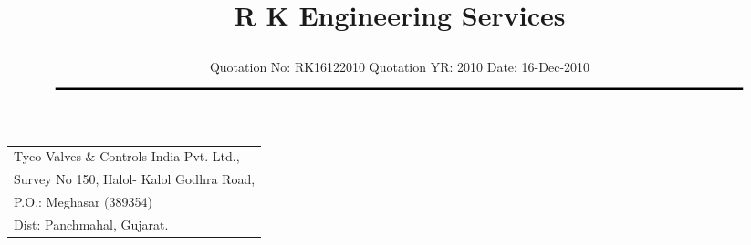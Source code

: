 \documentclass[11pt]{article}
\title{\vspace*{-1.5cm} \centerline{ \Huge \bf \hspace{0cm} R K Engineering Services}\vspace*{-0.75cm}}
\author{%
 \scriptsize Quotation No: RK16122010  \hspace*{4cm}  Quotation YR: 2010 \hspace*{4cm} Date: 16-Dec-2010\\
$\rule{7.5in}{0.5mm}$}
\date{}
\begin{document}
\maketitle
\thispagestyle{empty}
\vspace*{0.5cm}	
\begin{flushleft}
{\footnotesize
\begin{tabular}{l}
Tyco Valves \& Controls India Pvt. Ltd.,\\
Survey No 150, Halol- Kalol Godhra Road,\\
P.O.:  Meghasar (389354)\\
Dist: Panchmahal, Gujarat.\\
\end{tabular}
}
\end{flushleft}

\vspace*{1cm}

\vspace*{0.5cm}

\end{document}
